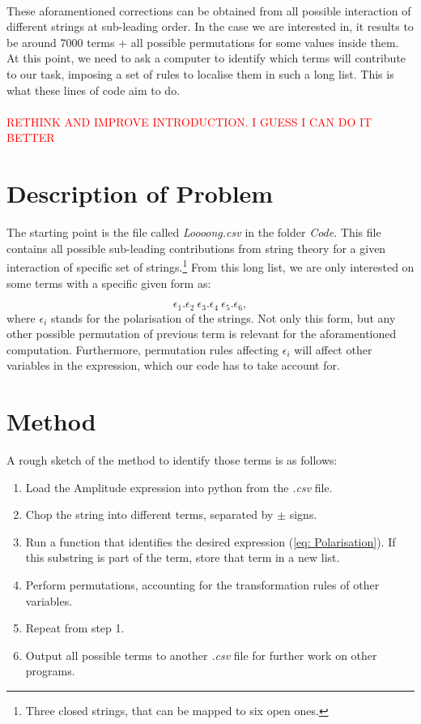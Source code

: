 \documentclass[11pt]{article} %
\begin{document}
\\
These aforamentioned corrections can be obtained from all possible interaction of different strings at sub-leading order. In the case we are interested in, it results to be around 7000 terms + all possible permutations for some values inside them. At this point, we need to ask a computer to identify which terms will contribute to our task, imposing a set of rules to localise them in such a long list. This is what these lines of code aim to do.\\
\\
\textcolor{red}{RETHINK AND IMPROVE INTRODUCTION. I GUESS I CAN DO IT BETTER}

\section{Description of Problem}

The starting point is the file called \textit{Loooong.csv} in the folder \textit{Code}. This file contains all possible sub-leading contributions from string theory for a given interaction of specific set of strings.\footnote{Three closed strings, that can be mapped to six open ones.} From this long list, we are only interested on some terms with a specific given form as:

\begin{equation}\label{eq: Polarisation}
    \epsilon_{1}.\epsilon_{2}\:\epsilon_{3}.\epsilon_{4}\:\epsilon_{5}.\epsilon_{6},
\end{equation}
where $\epsilon_{i}$ stands for the polarisation of the strings. Not only this form, but any other possible permutation of previous term is relevant for the aforamentioned computation. Furthermore, permutation rules affecting $\epsilon_{i}$ will affect other variables in the expression, which our code has to take account for.

\section{Method}

A rough sketch of the method to identify those terms is as follows:

\begin{enumerate}
    \item Load the Amplitude expression into python from the \textit{.csv} file.
    \item Chop the string into different terms, separated by $\pm$ signs.
    \item Run a function that identifies the desired expression (\ref{eq: Polarisation}). If this substring is part of the term, store that term in a new list.
    \item Perform permutations, accounting for the transformation rules of other variables.
    \item Repeat from step 1.
    \item Output all possible terms to another \textit{.csv} file for further work on other programs.
\end{enumerate}
\end{document}
